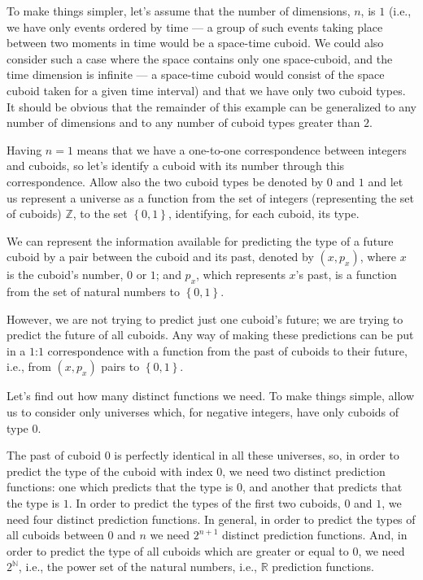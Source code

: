 \documentclass[a4paper
,draft
]{article}
\def\reale{\mathbb{R}}
\def\intregi{\mathbb{Z}}
\def\naturale{\mathbb{N}}
\newcommand{\multime}[1]{\left\{ #1 \right\}}
\begin{document}
To make things simpler, let's assume that the number of dimensions, $n$,
is $1$ (i.e., we have only events ordered by time --- a group of such events taking
place between two moments in time would be a space-time cuboid.
We could also consider such a
case where the space contains only one space-cuboid, and the time dimension is
infinite --- a space-time cuboid would consist of the space cuboid taken for a
given time interval) and that we have only two cuboid types.
It should be obvious that
the remainder of this example can be generalized to any number of dimensions
and to any number of cuboid types greater than $2$.

Having $n=1$ means that we have a one-to-one correspondence between
integers and cuboids, so let's identify a cuboid with its number through this
correspondence.
Allow also the two cuboid types be denoted by $0$ and $1$ and
let us represent a universe as a function from the set of integers
(representing the set of cuboids) $\intregi$,
to the set $\multime{0, 1}$, identifying, for each cuboid, its type.

We can represent the information available for predicting the type of a future
cuboid by a pair between the cuboid and its past, denoted
by $(x, p_x)$, where $x$ is the cuboid's number, $0$ or $1$;
and $p_x$, which represents $x$'s past, is a function from the set of natural
numbers to $\multime{0,1}$.

However, we are not trying to predict just one cuboid's future;
we are trying to predict the future of all cuboids.
Any way of making these predictions can be put in a $1$:$1$ correspondence
with a function from the past
of cuboids to their future, i.e., from $(x, p_x)$ pairs to $\multime{0, 1}$.

Let's find out how many distinct functions we need.
To make things simple, allow us to consider only universes which, for negative
integers, have only cuboids of type $0$.

The past of cuboid $0$ is perfectly identical in all these universes, so,
in order to predict the type of the cuboid with index $0$,
we need two distinct prediction functions: one which predicts that the type is
$0$, and another that predicts that the type is $1$.
In order to predict the types of the first two cuboids, $0$ and $1$, we need
four distinct prediction functions.
In general, in order to predict the types of all cuboids between $0$ and $n$
we need $2^{n+1}$ distinct prediction functions.
And, in order to predict the type of all cuboids which are greater or equal
to $0$, we need $2^\naturale$, i.e., the power set of the natural numbers,
i.e., $\reale$ prediction functions.
\end{document}
